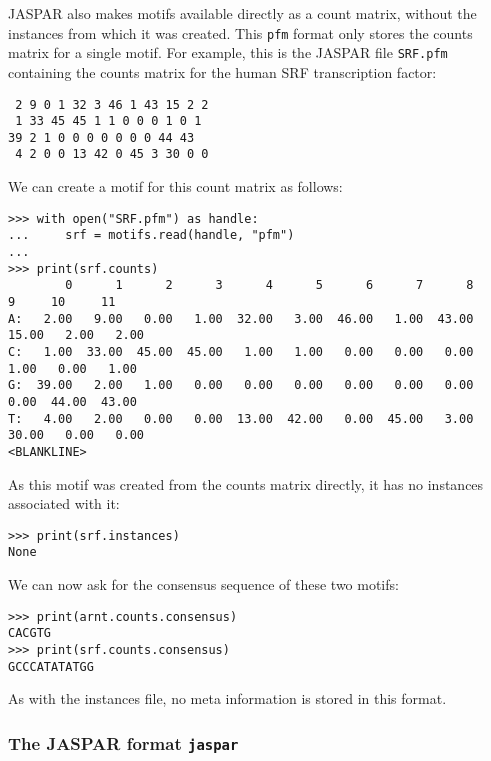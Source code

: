 JASPAR also makes motifs available directly as a count matrix,
without the instances from which it was created. This \verb+pfm+ format only
stores the counts matrix for a single motif.
For example, this is the JASPAR file \verb+SRF.pfm+ containing the counts matrix for the human SRF transcription factor:
\begin{verbatim}
 2 9 0 1 32 3 46 1 43 15 2 2
 1 33 45 45 1 1 0 0 0 1 0 1
39 2 1 0 0 0 0 0 0 0 44 43
 4 2 0 0 13 42 0 45 3 30 0 0
\end{verbatim}
We can create a motif for this count matrix as follows:
\begin{verbatim}
>>> with open("SRF.pfm") as handle:
...     srf = motifs.read(handle, "pfm")
...
>>> print(srf.counts)
        0      1      2      3      4      5      6      7      8      9     10     11
A:   2.00   9.00   0.00   1.00  32.00   3.00  46.00   1.00  43.00  15.00   2.00   2.00
C:   1.00  33.00  45.00  45.00   1.00   1.00   0.00   0.00   0.00   1.00   0.00   1.00
G:  39.00   2.00   1.00   0.00   0.00   0.00   0.00   0.00   0.00   0.00  44.00  43.00
T:   4.00   2.00   0.00   0.00  13.00  42.00   0.00  45.00   3.00  30.00   0.00   0.00
<BLANKLINE>
\end{verbatim}
As this motif was created from the counts matrix directly, it has no instances associated with it:
\begin{verbatim}
>>> print(srf.instances)
None
\end{verbatim}
We can now ask for the consensus sequence of these two motifs:
\begin{verbatim}
>>> print(arnt.counts.consensus)
CACGTG
>>> print(srf.counts.consensus)
GCCCATATATGG
\end{verbatim}

As with the instances file, no meta information is stored in this format.

\subsubsection*{The JASPAR format \texttt{jaspar}}

